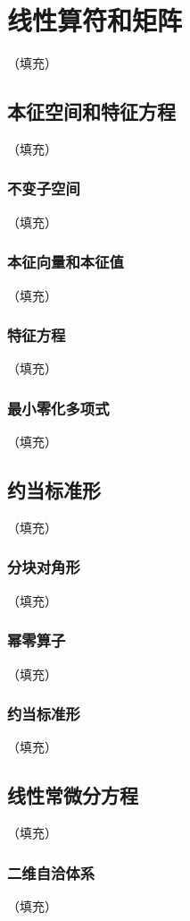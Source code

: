 \documentclass[hyperref,UTF8]{ctexbook}
\begin{document}
\chapter{线性算符和矩阵}（填充）
\section{本征空间和特征方程}（填充）
\subsection{不变子空间}（填充）
\subsection{本征向量和本征值}（填充）
\subsection{特征方程}（填充）
\subsection{最小零化多项式}（填充）
\section{约当标准形}（填充）
\subsection{分块对角形}（填充）
\subsection{幂零算子}（填充）
\subsection{约当标准形}（填充）
\section{线性常微分方程}（填充）
\subsection{二维自洽体系}（填充）
\end{document}
